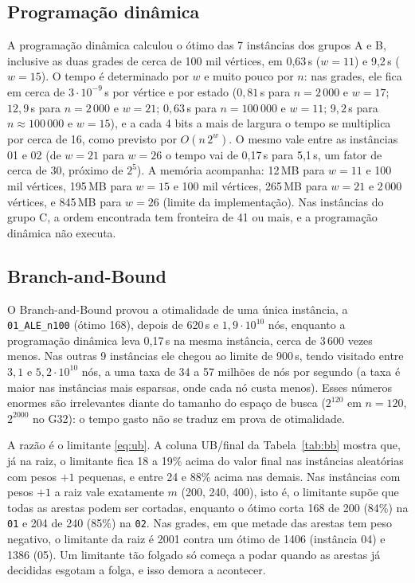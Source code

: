\subsection{Programação dinâmica}

A programação dinâmica calculou o ótimo das 7 instâncias dos grupos A e B, inclusive as duas grades de cerca de 100 mil vértices, em 0,63\,s ($w=11$) e 9,2\,s ($w=15$). O tempo é determinado por $w$ e muito pouco por $n$: nas grades, ele fica em cerca de $3\cdot10^{-9}$\,s por vértice e por estado ($0{,}81$\,s para $n=2\,000$ e $w=17$; $12{,}9$\,s para $n=2\,000$ e $w=21$; $0{,}63$\,s para $n=100\,000$ e $w=11$; $9{,}2$\,s para $n\approx100\,000$ e $w=15$), e a cada 4 bits a mais de largura o tempo se multiplica por cerca de 16, como previsto por $O(n\,2^{w})$. O mesmo vale entre as instâncias 01 e 02 (de $w=21$ para $w=26$ o tempo vai de 0,17\,s para 5,1\,s, um fator de cerca de 30, próximo de $2^5$). A memória acompanha: 12\,MB para $w=11$ e 100 mil vértices, 195\,MB para $w=15$ e 100 mil vértices, 265\,MB para $w=21$ e 2\,000 vértices, e 845\,MB para $w=26$ (limite da implementação). Nas instâncias do grupo C, a ordem encontrada tem fronteira de 41 ou mais, e a programação dinâmica não executa.

\subsection{Branch-and-Bound}

O Branch-and-Bound provou a otimalidade de uma única instância, a \texttt{01\_ALE\_n100} (ótimo 168), depois de 620\,s e $1{,}9\cdot10^{10}$ nós, enquanto a programação dinâmica leva 0,17\,s na mesma instância, cerca de 3\,600 vezes menos. Nas outras 9 instâncias ele chegou ao limite de 900\,s, tendo visitado entre $3{,}1$ e $5{,}2\cdot10^{10}$ nós, a uma taxa de 34 a 57 milhões de nós por segundo (a taxa é maior nas instâncias mais esparsas, onde cada nó custa menos). Esses números enormes são irrelevantes diante do tamanho do espaço de busca ($2^{120}$ em $n=120$, $2^{2000}$ no G32): o tempo gasto não se traduz em prova de otimalidade.

A razão é o limitante \eqref{eq:ub}. A coluna UB/final da Tabela~\ref{tab:bb} mostra que, já na raiz, o limitante fica 18 a 19\% acima do valor final nas instâncias aleatórias com pesos $+1$ pequenas, e entre 24 e 88\% acima nas demais. Nas instâncias com pesos $+1$ a raiz vale exatamente $m$ (200, 240, 400), isto é, o limitante supõe que todas as arestas podem ser cortadas, enquanto o ótimo corta 168 de 200 (84\%) na \texttt{01} e 204 de 240 (85\%) na \texttt{02}. Nas grades, em que metade das arestas tem peso negativo, o limitante da raiz é 2001 contra um ótimo de 1406 (instância 04) e 1386 (05). Um limitante tão folgado só começa a podar quando as arestas já decididas esgotam a folga, e isso demora a acontecer.

